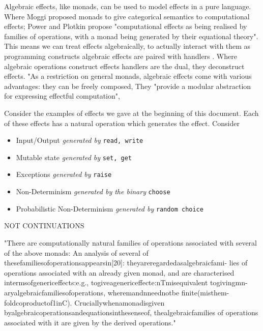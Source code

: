 Algebraic effects, like monads, can be used to model effects in a pure language.
Where Moggi \cite{moggi1989computational} proposed monads to give categorical semantics to computational effects;
Power and Plotkin \cite{Plotkin:2002dw} propose "computational effects as being realised by
families of operations, with a monad being generated by their equational theory".
This means we can treat effects algebraically,
to actually interact with them as programming constructs algebraic effects are paired with
handlers \cite{plotkin2009handlers}.
Where algebraic operations construct effects handlers are the dual, they deconstruct effects.
"As a restriction on general monads, algebraic effects come with various advantages:
they can be freely composed,
\cite{leijen2017type}
They "provide a modular abstraction for expressing effectful computation"\cite{dolan2015effective},


\begin{example}
    Consider the examples of effects we gave at the beginning of this document.
    Each of these effects has a natural operation which generates the effect.
    Consider
    \begin{itemize}
        \item Input/Output \textit{generated by} \texttt{read, write}
        \item Mutable state \textit{generated by} \texttt{set, get}
        \item Exceptions \textit{generated by} \texttt{raise}
        \item Non-Determinism \textit{generated by the binary} \texttt{choose}
        \item Probabilistic Non-Determinism \textit{generated by} \texttt{random choice}
    \end{itemize}
\end{example}

NOT CONTINUATIONS

"There are computationally natural families of operations associated with several of the above monads:
An analysis of several of thesefamiliesofoperationsappearsin[20]:
theyareregardedasalgebraicfami- lies of operations associated with an already given monad,
and are characterised intermsofgenericeffects:e.g.,
togiveagenericeffecte:nTmisequivalent togivingmn-aryalgebraicfamiliesofoperations,
wheremandnneednotbe finite(misthem-foldcoproductof1inC).
Cruciallywhenamonadisgiven byalgebraicoperationsandequationsinthesenseof,
thealgebraicfamilies of operations associated with it are given by the derived operations."
\cite{Plotkin:2002dw}

